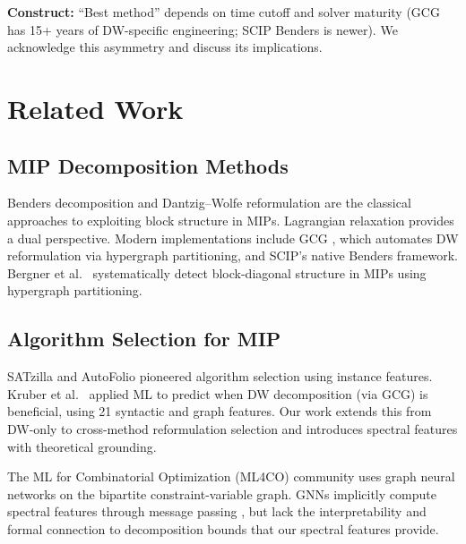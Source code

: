 \documentclass[12pt]{article}
\begin{document}
\textbf{Construct:} ``Best method'' depends on time cutoff and solver
maturity (GCG has 15+ years of DW-specific engineering; SCIP Benders is
newer).  We acknowledge this asymmetry and discuss its implications.

\section{Related Work}
\label{sec:related}

\subsection{MIP Decomposition Methods}

Benders decomposition \citep{benders1962partitioning} and Dantzig--Wolfe
reformulation \citep{dantzig1960decomposition} are the classical approaches
to exploiting block structure in MIPs.  Lagrangian relaxation
\citep{fisher1981lagrangian,geoffrion1974lagrangean} provides a dual
perspective.  Modern implementations include GCG
\citep{gamrath2010generic,gamrath2023gcg}, which automates DW reformulation
via hypergraph partitioning, and SCIP's native Benders framework.
Bergner et al.~\citep{bergner2015automatic} systematically detect
block-diagonal structure in MIPs using hypergraph partitioning.

\subsection{Algorithm Selection for MIP}

SATzilla \citep{xu2008satzilla} and AutoFolio \citep{lindauer2015autofolio}
pioneered algorithm selection using instance features.  Kruber et al.\
\citep{kruber2017learning} applied ML to predict when DW decomposition
(via GCG) is beneficial, using 21 syntactic and graph features.  Our work
extends this from DW-only to cross-method reformulation selection and
introduces spectral features with theoretical grounding.

The ML for Combinatorial Optimization (ML4CO) community
\citep{gasse2019exact,nair2020solving,bengio2021machine} uses graph neural
networks on the bipartite constraint-variable graph.  GNNs implicitly
compute spectral features through message passing
\citep{xu2019powerful}, but lack the interpretability and formal connection
to decomposition bounds that our spectral features provide.
\end{document}
